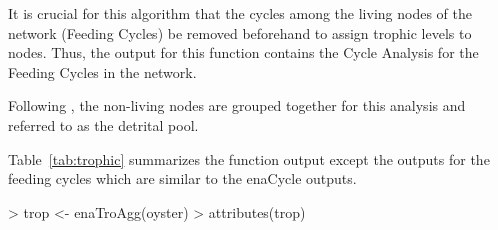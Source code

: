 \documentclass[article]{jss}
\begin{document}
It is crucial for this algorithm that the cycles among the living
nodes of the network (Feeding Cycles) be removed beforehand to assign
trophic levels to nodes. Thus, the output for this function contains
the Cycle Analysis for the Feeding Cycles in the network.

Following \citet{ulanowicz91}, the non-living nodes are grouped together for
this analysis and referred to as the detrital pool.

Table~\ref{tab:trophic} summarizes the function output except the outputs
for the feeding cycles which are similar to the enaCycle outputs.


\begin{Schunk}
\begin{Sinput}
> trop <- enaTroAgg(oyster)
> attributes(trop)
\end{Sinput}
\end{Schunk}
\end{document}
